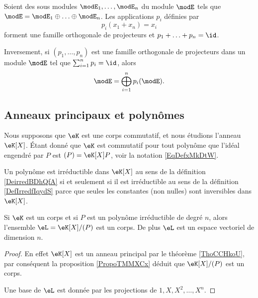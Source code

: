 \begin{theorem}     \label{ThoProjModpAlsUR}
    Soient des sous modules \( \modE_1,\ldots,\modE_n\) du module \( \modE\) tels que \( \modE=\modE_1\oplus\ldots\oplus\modE_n\). Les applications \( p_i\) définies par
    \begin{equation}
        p_i(x_1+x_n)=x_i
    \end{equation}
    forment une famille orthogonale de projecteurs et \( p_1+\ldots +p_n=\id\).

    Inversement, si \( (p_1,\ldots, p_n)\) est une famille orthogonale de projecteurs dans un module \( \modE\) tel que \( \sum_{i=1}^np_i=\id\), alors
    \begin{equation}
        \modE=\bigoplus_{i=1}^np_i(\modE).
    \end{equation}
\end{theorem}



\subsection{Anneaux principaux et polynômes}

Nous supposons que \( \eK\) est une corps commutatif, et nous étudions l'anneau \( \eK[X]\). Étant donné que \( \eK\) est commutatif pour tout polynôme que l'idéal engendré par \( P\) est \( (P)=\eK[X]P\), voir la notation \eqref{EqDefxMkDtW}.

\begin{remark}
    Un polynôme est irréductible dans \( \eK[X]\) au sens de la définition \ref{DeirredBDhQfA} si et seulement si il est irréductible au sens de la définition \ref{DefIrredfIqydS} parce que seules les constantes (non nulles) sont inversibles dans \( \eK[X]\).
\end{remark}

\begin{corollary}       \label{CorsLGiEN}
    Si \( \eK\) est un corps et si \( P\) est un polynôme irréductible de degré \( n\), alors l'ensemble \( \eL=\eK[X]/(P)\) est un corps. De plus \( \eL\) est un espace vectoriel de dimension \( n\).
\end{corollary}

\begin{proof}
    En effet \( \eK[X]\) est un anneau principal par le théorème \ref{ThoCCHkoU}, par conséquent la proposition \ref{PropoTMMXCx} déduit que \( \eK[X]/(P)\) est un corps.

    Une base de \( \eL\) est donnée par les projections de \( 1,X,X^2,\ldots, X^n\).
\end{proof}

